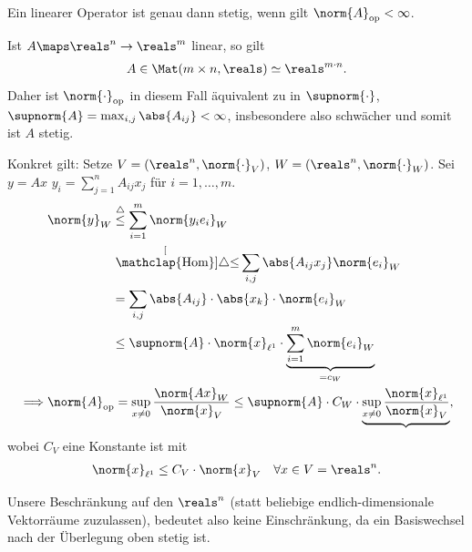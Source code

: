 \begin{bemerkung}
    Ein linearer Operator ist genau dann stetig, wenn gilt \( \norm{A}_{\text{op}}<\infty \).
\end{bemerkung}
\begin{beispiel*}
    Ist \( A\maps \reals^n \to \reals^m \) linear, so gilt 
    \begin{align*}
        A\in \Mat(m\times n,\reals)\simeq \reals^{m\cdot n}.
    \end{align*}
    Daher ist \( \norm{\cdot}_{\text{op}} \) in diesem Fall äquivalent zu in \( \supnorm{\cdot} \), \( \supnorm{A}=\max_{i,j}\abs{A_{ij}}<\infty \), insbesondere also schwächer und somit ist \( A \) stetig.

    Konkret gilt: Setze \( V=(\reals^n, \norm{\cdot}_{V}) \), \( W=(\reals^n,\norm{\cdot}_W) \).
    Sei \( y=Ax \) \timplies \( y_i=\sum_{j=1}^{n}A_{ij}x_j\) für \( i=1,\dotsc,m \).
    \begin{align*}
        &\norm{y}_{W}\begin{aligned}[t]
            &\overset{\triangle}{\leq}\sum_{i=1}^{m}\norm{y_i e_i}_{W}\\
            &\stackrel[\mathclap{\text{Hom}}]{\triangle}{\leq}\sum_{i,j}\abs{A_{ij}x_j}\norm{e_i}_{W}\\
            &=\sum_{i,j}\abs{A_{ij}}\cdot\abs{x_k}\cdot\norm{e_i}_{W}\\
            &\leq \supnorm{A}\cdot\norm{x}_{\ell^1}\cdot \underbrace{\sum_{i=1}^{m}\norm{e_i}_W}_{=c_W}
        \end{aligned}\\
        \implies &\norm{A}_{\text{op}}=\sup_{x\neq 0}\frac{\norm{Ax}_{W}}{\norm{x}_V}\leq \supnorm{A}\cdot C_W\cdot\underbrace{\sup_{x\neq 0}\frac{\norm{x}_{\ell^1}}{\norm{x}_V}},        
    \end{align*}
    wobei \( C_V \) eine Konstante ist mit
    \begin{align*}
        \norm{x}_{\ell^1}\leq C_V\cdot \norm{x}_V\quad \forall x\in V=\reals^n.
    \end{align*}
\end{beispiel*}
\begin{bemerkung*}
    Unsere Beschränkung auf den \( \reals^n \) (statt beliebige endlich-dimensionale Vektorräume zuzulassen), bedeutet also keine Einschränkung, da ein Basiswechsel nach der Überlegung oben stetig ist.
\end{bemerkung*}

